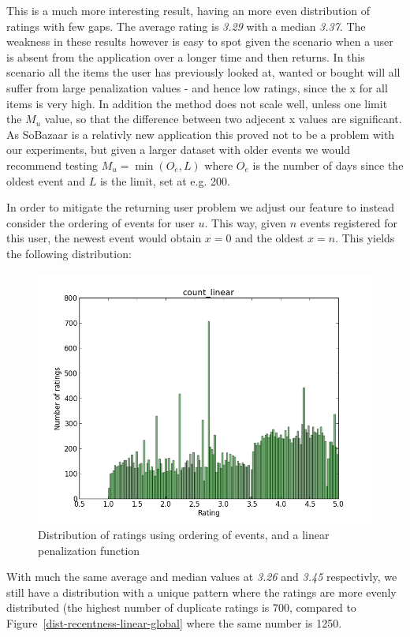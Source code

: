 This is a much more interesting result, having an more even distribution of
ratings with few gaps. The average rating is \textit{3.29} with a median
\textit{3.37}. The weakness in these results however is easy to spot given the
scenario when a user is absent from the application over a longer time and then
returns. In this scenario all the items the user has previously looked at,
wanted or bought will all suffer from large penalization values - and hence low
ratings, since the x for all items is very high. In addition the method does
not scale well, unless one limit the $M_u$ value, so that the difference
between two adjecent x values are significant. As SoBazaar is a relativly new
application this proved not to be a problem with our experiments, but given a
larger dataset with older events we would recommend testing $M_u = \min(O_e,
L)$ where $O_e$ is the number of days since the oldest event and $L$ is the
limit, set at e.g. 200.

In order to mitigate the returning user problem we adjust our feature to
instead consider the ordering of events for user $u$. This way, given $n$
events registered for this user, the newest event would obtain $x=0$ and the
oldest $x=n$. This yields the following distribution:

\begin{figure}[H]
  \centering
  \includegraphics[scale=0.6]{image/dist-count-linear}
 \caption{Distribution of ratings using ordering of events, and a linear
 penalization function} 
\end{figure}

With much the same average and median values at \textit{3.26} and \textit{3.45}
respectivly, we still have a distribution with a unique pattern where the
ratings are more evenly distributed (the highest number of duplicate ratings
is 700, compared to Figure~\ref{dist-recentness-linear-global} where the same
number is 1250.

